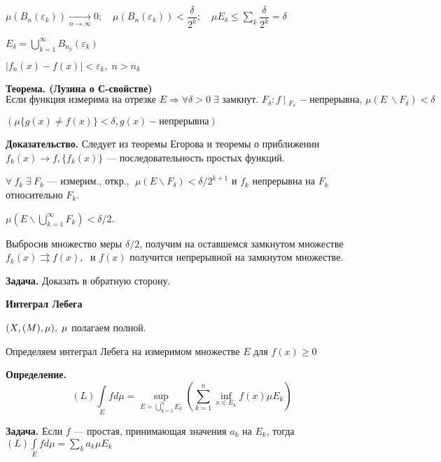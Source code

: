 $\mu (B_n(\varepsilon_k)) \xrightarrow[n \rightarrow \infty]{} 0;
\quad \mu (B_n(\varepsilon_k)) < \dfrac{\delta}{2^k}; \quad \mu
E_\delta \leqslant \sum\limits_k \dfrac{\delta}{2^k} = \delta$
%
%
%
%
%
%
%
%
%
%
%
%

$E_\delta = \bigcup_{k = 1}^\infty B_{n_k} (\varepsilon_k)$

$| f_n(x) - f(x) | < \varepsilon_k, \; n > n_k$

\textbf{Теорема. (Лузина о С-свойстве) } \quad
 $\text{Если функция измерима на отрезке } E \Rightarrow \forall
 \delta > 0 \; \exists \text{ замкнут. }
 F_\delta : f \:|\phantom:_{F_\delta} - \text{непрерывна, }
 \mu (E \: \backslash F_\delta) < \delta$

$( \mu\{ g(x) \neq f(x)\} < \delta, g(x) - \text{непрерывна}  )$

\textbf{Доказательство.} \quad Следует из теоремы Егорова и
теоремы о приближении $f_k(x) \rightarrow f, \{f_k(x)\}$ ---
последовательность простых функций.

 $\forall \: f_k \; \exists \:
F_k$ --- измерим., откр., $\; \mu (E \backslash F_\delta) < \delta
/ 2^{k+1}$ и $f_k$ непрерывна на $F_k$ относительно $F_k$.

$\mu (E \backslash \bigcup_{k = 1}^\infty F_k) < \delta / 2$.

Выбросив множество меры $\delta / 2$, получим на оставшемся
замкнутом множестве $f_k(x) \rightrightarrows f(x), \; \text{ и }
f(x)$ получится непрерывной на замкнутом множестве.

\textbf{Задача.} \quad Доказать в обратную сторону.

\begin{center}
\textbf{Интеграл Лебега}
\end{center}

$(X, \EuScript(M), \mu), \; \mu $ полагаем полной.

Определяем интеграл Лебега на измеримом множестве $E$ для $f(x)
\geqslant 0$

\textbf{Определение.} \quad $$(L) \int\limits_{E} f d\mu =
\sup\limits_{E = \bigcup_{k = 1}^n E_k} \left( \sum\limits_{k =
1}^n \inf\limits_{x \in E_k} f(x) \mu E_k \right)$$

\textbf{Задача.} \quad Если $f$ --- простая, принимающая значения
$a_k$ на $E_k$, тогда $(L) \int\limits_E f d\mu = \sum\limits_k
a_k \mu E_k$

